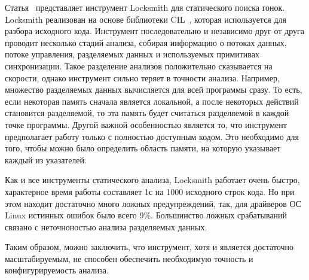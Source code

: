 Статья~\cite{Pratikakis:2011} представляет инструмент Locksmith для статического поиска гонок.
Locksmith реализован на основе библиотеки CIL~\cite{CIL}, которая используется для разбора исходного кода.
Инструмент последовательно и независимо друг от друга проводит несколько стадий анализа, собирая информацию о потоках данных, потоке управления, разделяемых данных и используемых примитивах синхронизации.
Такое разделение анализов положительно сказывается на скорости, однако инструмент сильно теряет в точности анализа.
Например, множество разделяемых данных вычисляется для всей программы сразу. 
То есть, если некоторая память сначала является локальной, а после некоторых действий становится разделяемой, то эта память будет считаться разделяемой в каждой точке программы.
Другой важной особенностью является то, что инструмент предполагает работу только с полностью доступным кодом.
Это необходимо для того, чтобы можно было определить область памяти, на которую указывает каждый из указателей.

Как и все инструменты статического анализа, Locksmith работает очень быстро, характерное время работы составляет 1с на 1000 исходного строк кода.
Но при этом находит достаточно много ложных предупреждений, так, для драйверов ОС Linux истинных ошибок было всего 9\%.
Большинство ложных срабатываний связано с неточноностью анализа разделяемых данных.

Таким образом, можно заключить, что инструмент, хотя и является достаточно масштабируемым, не способен обеспечить необходимую точность и конфигурируемость анализа.

